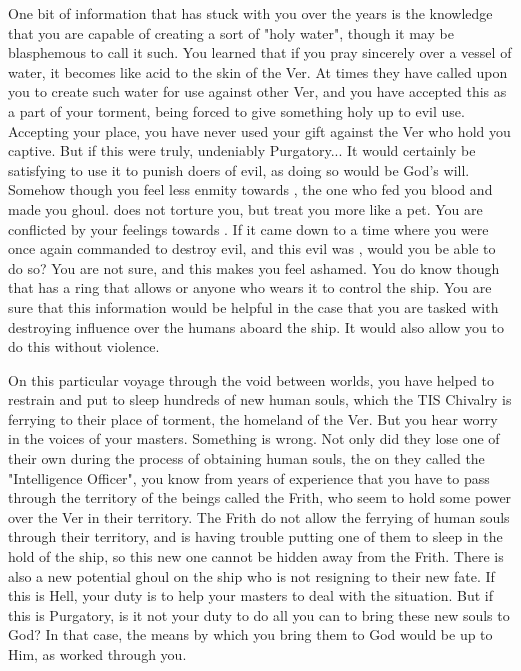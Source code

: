 \documentclass[char]{guildcamp4}
\begin{document}
One bit of information that has stuck with you over the years is the knowledge that you are capable of creating a sort of "holy water", though it may be blasphemous to call it such. You learned that if you pray sincerely over a vessel of water, it becomes like acid to the skin of the Ver. At times they have called upon you to create such water for use against other Ver, and you have accepted this as a part of your torment, being forced to give something holy up to evil use. Accepting your place, you have never used your gift against the Ver who hold you captive. But if this were truly, undeniably Purgatory... It would certainly be satisfying to use it to punish doers of evil, as doing so would be God's will. Somehow though you feel less enmity towards \cVone{}, the one who fed you \cVone{\their} blood and made you \cVone{\their} ghoul. \cVone{\They} does not torture you, but treat you more like a pet. You are conflicted by your feelings towards \cVone{\them}. If it came down to a time where you were once again commanded to destroy evil, and this evil was \cVone{\them}, would you be able to do so? You are not sure, and this makes you feel ashamed. You do know though that \cVone{} has a ring that allows \cVone{\them} or anyone who wears it to control the ship. You are sure that this information would be helpful in the case that you are tasked with destroying \cVone{\their} influence over the humans aboard the ship. It would also allow you to do this without violence.

On this particular voyage through the void between worlds, you have helped to restrain and put to sleep hundreds of new human souls, which the TIS Chivalry is ferrying to their place of torment, the homeland of the Ver. But you hear worry in the voices of your masters. Something is wrong. Not only did they lose one of their own during the process of obtaining human souls, the on they called the "Intelligence Officer", you know from years of experience that you have to pass through the territory of the beings called the Frith, who seem to hold some power over the Ver in their territory. The Frith do not allow the ferrying of human souls through their territory, and \cVthree{} is having trouble putting one of them to sleep in the hold of the ship, so this new one cannot be hidden away from the Frith. There is also a new potential ghoul on the ship who is not resigning to their new fate. If this is Hell, your duty is to help your masters to deal with the situation. But if this is Purgatory, is it not your duty to do all you can to bring these new souls to God? In that case, the means by which you bring them to God would be up to Him, as worked through you.
\end{document}
